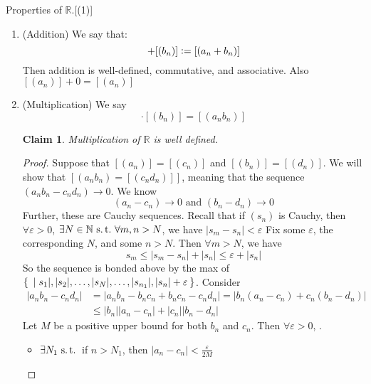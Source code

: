 \documentclass[12pt]{amsart}
\newcommand{\bbR}{\mathbb{R}}
\newcommand{\bbN}{\mathbb{N}}
\newcommand{\suchthat}{\operatorname{\thinspace s.t. \thinspace}}
\theoremstyle{plain}
\newtheorem*{claim}{Claim}
\theoremstyle{remark}
\theoremstyle{definition}
\begin{document}
\par
Properties of $\bbR$.[(1)]
\begin{enumerate}
	\item (Addition)
		We say that: 
		\begin{equation*}
			[(a_n)] + [(b_n)] \vcentcolon = [(a_n+b_n)]
		\end{equation*}
		Then addition is well-defined, commutative, and associative. Also $[(a_n)] + 0 = [(a_n)]$
	\item (Multiplication)
		We say 
		\begin{equation*}
			[(a_n)]\cdot[(b_n)] = [(a_nb_n)]
		\end{equation*}
		\begin{claim}
			Multiplication of $\bbR$ is well defined.
		\end{claim}
		\begin{proof}
			Suppose that $[(a_n)] = [(c_n)]$ and $[(b_n)] = [(d_n)]$. We will show that $[(a_nb_n) = [(c_nd_n)]]$, meaning that the sequence $(a_nb_n - c_nd_n) \rightarrow 0$.
			\newline
			We know 
			\begin{equation*}
				(a_n - c_n) \rightarrow 0 \mbox{ and } (b_n - d_n) \rightarrow 0
			\end{equation*}
			Further, these are Cauchy sequences. Recall that if $(s_n)$ is Cauchy, then $\forall \varepsilon > 0$, $\exists N \in\bbN \suchthat \forall m,n > N$, we have $|s_m - s_n| < \varepsilon$
			\newline
			Fix some $\varepsilon$, the corresponding $N$, and some $n > N$. Then $\forall m > N$, we have
			\begin{equation*}
			s_m \leqslant |s_m - s_n| + |s_n| \leqslant \varepsilon + |s_n|
			\end{equation*}
			So the sequence is bonded above by the max of $\Set{|s_1|, |s_2|, \dots,|s_N|,\dots,|s_{n_1}|,|s_n| + \varepsilon}$.
			Consider 
			\begin{equation*}
			\begin{split}
			|a_n b_n - c_n d_n| &= |a_n b_n - b_n c_n + b_n c_n - c_n d_n| = |b_n(a_n - c_n) + c_n(b_n - d_n)|\\
		&\leqslant |b_n||a_n - c_n| + |c_n||b_n - d_n|
			\end{split}
			\end{equation*}
			Let $M$ be a positive upper bound for both $b_n$ and $c_n$. Then $\forall \varepsilon > 0$, . 
			\begin{itemize}[-]
				\item $\exists N_1 \suchthat$ if $n > N_1$, then $|a_n - c_n| < \frac{\varepsilon}{2M}$

\end{itemize}
\end{proof}
\end{enumerate}
\end{document}

